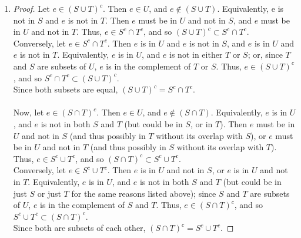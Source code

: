 \documentclass{homework}
\begin{document}
\begin{solution}
\begin{enumerate}[label=(\alph*)]
  \item 
    \begin{proof}[Proof]
      Let $e\in \left( S\cup T \right) ^{c}$. Then $e\in U$, and $e\not\in \left( S\cup T \right)$.
      Equivalently, e is not in $S$ and $e$ is not in $T$. Then $e$ must be in $U$ and not in $S$, and
      $e$ must be in $U$ and not in $T$. Thus, $e\in S^{c}\cap T^{c}$, and so $\left( S\cup T
      \right) ^{c}\subset S^{c}\cap T^{c}$.\\
    Conversely, let $e\in S^{c}\cap T^{c}$. Then  $e$ is in $U$ and $e$ is not in $S$, and $e$ is in
    $U$ and  $e$ is not in $T$. Equivalently, $e$ is in $U$, and $e$ is not in either $T$ or $S$;
    or, since $T$ and $S$ are subsets of $U$, $e$ is in the complement of $T$ or $S$. Thus, $e\in
    \left( S\cup T \right) ^{c}$, and so $S^{c}\cap T^{c}\subset \left( S\cup T \right) ^{c}$.\\
    Since both subsets are equal, $\left( S\cup T \right) ^{c}=S^{c}\cap T^{c}$. \\ \\
    Now, let $e\in \left( S\cap T \right) ^{c}$. Then $e\in U$, and $e\not\in \left( S\cap T
    \right)$. Equivalently, $e$ is in $U$, and $e$ is not in both $S$ and $T$ (but could be in $S$,
    or in $T$). Then $e$ must be in $U$ and not
    in $S$ (and thus possibly in $T$ without its overlap with $S$), or $e$ must be in $U$ and not in $T$ (and
    thus possibly in $S$ without its overlap with $T$). Thus, $e\in S^{c}\cup T^{c}$, and so $\left( S\cap
    T\right) ^{c} \subset S^{c}\cup T^{c}$.\\
    Conversely, let $e\in S^{c}\cup T^{c}$. Then $e$ is in $U$ and not in $S$, or $e$ is in $U$ and
    not in $T$. Equivalently,  $e$ is in $U$, and $e$ is not in both $S$ and $T$ (but could be in
    just $S$ or just $T$ for the same reasons listed above); since $S$ and $T$ are subsets of $U$, $e$ is in the complement of $S$ 
    and $T$. Thus, $e\in \left( S\cap T \right) ^{c}$, and so $S^{c}\cup T^{c}\subset \left( S\cap 
    T \right) ^{c}$.\\
    Since both are subsets of each other, $\left( S\cap T \right) ^{c}=S^{c}\cup T^{c}$.
    \end{proof}


\end{enumerate}
\end{solution}
\end{document}
